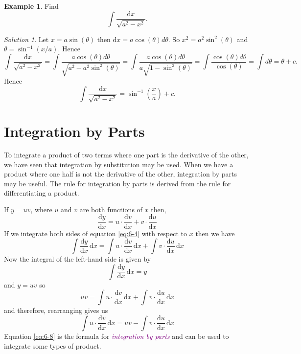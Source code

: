\documentclass[
  english,
  11pt,
  oneside]{book}
\newcommand{\slide}{}
\theoremstyle{definition}
\theoremstyle{definition}
\newtheorem{example}{Example}[chapter]
\theoremstyle{definition}
\theoremstyle{definition}
\theoremstyle{remark}
\newtheorem*{solution}{Solution}
\begin{document}
\slide

\begin{example}
Find
\[
\int\frac{\mathrm{d}x}{\sqrt{a^2-x^2}}.
\]
\end{example}

\begin{solution}
Let \(x = a\sin(\theta)\) then \(\mathrm{d}x = a\cos(\theta)d\theta\). So \(x^2 = a^2\sin^2(\theta)\) and \(\theta = \sin^{-1}(x/a)\). Hence
\[
\int\frac{\mathrm{d}x}{\sqrt{a^2-x^2}} = \int\frac{a\cos(\theta)d\theta}{\sqrt{a^2-a^2\sin^2(\theta)}} = \int\frac{a\cos(\theta)d\theta}{a\sqrt{1-\sin^2(\theta)}} = \int\frac{\cos(\theta)d\theta}{\cos(\theta)} = \int d\theta = \theta + c.
\]
Hence
\[
\int\frac{\mathrm{d}x}{\sqrt{a^2-x^2}} = \sin^{-1}\left(\frac xa\right) + c.
\]
\end{solution}

\slide

\section{Integration by Parts}\label{integration-by-parts}

To integrate a product of two terms where one part is the derivative of the other, we have seen that integration by substitution may be used. When we have a product where one half is not the derivative of the other, integration by parts may be useful. The rule for integration by parts is derived from the rule for differentiating a product.

If \(y = uv\), where \(u\) and \(v\) are both functions of \(x\) then,
\begin{equation}
\frac{\mathrm{d}y}{\mathrm{d}x} = u\cdot\frac{\mathrm{d}v}{\mathrm{d}x} + v\cdot\frac{\mathrm{d}u}{\mathrm{d}x}
\label{eq:6-4}
\end{equation}
If we integrate both sides of equation \eqref{eq:6-4} with respect to \(x\) then we have
\begin{equation}
\int\frac{\mathrm{d}y}{\mathrm{d}x}\,\mathrm{d}x = \int u\cdot\frac{\mathrm{d}v}{\mathrm{d}x}\,\mathrm{d}x + \int v\cdot\frac{\mathrm{d}u}{\mathrm{d}x}\,\mathrm{d}x
\label{eq:6-5}
\end{equation}
Now the integral of the left-hand side is given by
\begin{equation}
\int\frac{\mathrm{d}y}{\mathrm{d}x}\,\mathrm{d}x = y
\label{eq:6-6}
\end{equation}
and \(y = uv\) so
\begin{equation}
uv =\int u\cdot\frac{\mathrm{d}v}{\mathrm{d}x}\,\mathrm{d}x +\int v\cdot\frac{\mathrm{d}u}{\mathrm{d}x}\,\mathrm{d}x
\label{eq:6-7}
\end{equation}
and therefore, rearranging gives us
\begin{equation}
\int u\cdot \frac{\mathrm{d}v}{\mathrm{d}x}\,\mathrm{d}x = uv -\int v\cdot\frac{\mathrm{d}u}{\mathrm{d}x}\,\mathrm{d}x
\label{eq:6-8}
\end{equation}
Equation \eqref{eq:6-8} is the formula for \textcolor{purple}{\em integration by parts} and can be used to integrate some types of
product.
\end{document}
